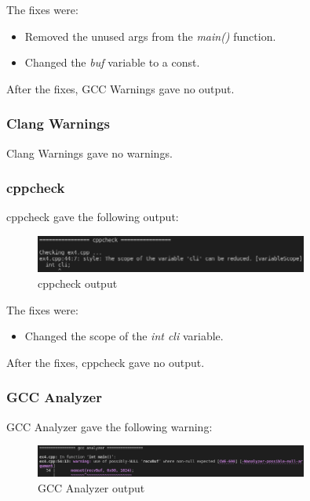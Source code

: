 \documentclass{article}
\begin{document}
The fixes were:

\begin{itemize}
    \item Removed the unused args from the \textit{main()} function.
    \item Changed the \textit{buf} variable to a const.
\end{itemize}

After the fixes, GCC Warnings gave no output.

\subsubsection{Clang Warnings}

Clang Warnings gave no warnings.

\subsubsection{cppcheck}

cppcheck gave the following output:

\begin{figure}[ht!]
    \centering
    \includegraphics[width=0.8\textwidth]{images/ex4/cppcheck.png}
    \caption{cppcheck output}\label{fig:ex4/cppcheck}
\end{figure}

The fixes were:

\begin{itemize}
    \item Changed the scope of the \textit{int cli} variable.
\end{itemize}

After the fixes, cppcheck gave no output.

\subsubsection{GCC Analyzer}

GCC Analyzer gave the following warning:

\begin{figure}[ht!]
    \centering
    \includegraphics[width=0.8\textwidth]{images/ex4/gccAnalyzer.png}
    \caption{GCC Analyzer output}\label{fig:ex4/gccAnalyzer}
\end{figure}
\end{document}
